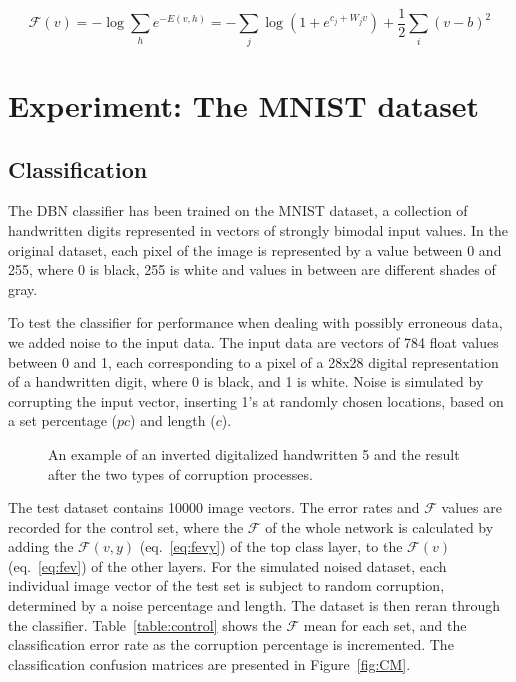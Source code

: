 \documentclass{report}
\begin{document}
\begin{equation}
\mathcal{F}(v) = -\log \sum_h e^{-E(v,h)} =  - \sum_j \log (1 + e^{c_j + W_j v}) + \frac{1}{2} \sum_i (v - b)^2
\label{eq:fegbv}
\end{equation}




\section{Experiment: The MNIST dataset}
\subsection{Classification}
The DBN classifier has been trained on the MNIST dataset, a collection of handwritten digits represented in vectors of strongly bimodal input values. In the original dataset, each pixel of the image is represented by a value between 0 and 255, where 0 is black, 255 is white and values in between are different shades of gray.


To test the classifier for performance when dealing with possibly erroneous data, we added noise to the input data. The input data are vectors of 784 float values between 0 and 1, each corresponding to a pixel of a 28x28 digital representation of a handwritten digit, where 0 is black, and 1 is white. Noise is simulated by corrupting the input vector, inserting 1's at randomly chosen locations, based on a set percentage ($pc$) and length ($c$).

\begin{figure}[h!]
	\caption{An example of an inverted digitalized handwritten 5 and the result after the two types of corruption processes.}
\end{figure}


The test dataset contains 10000 image vectors. The error rates and $\mathcal{F}$ values are recorded for the control set, where the $\mathcal{F}$ of the whole network is calculated by adding the $\mathcal{F}(v,y)$ (eq.~\ref{eq:fevy}) of the top class layer, to the $\mathcal{F}(v)$ (eq.~\ref{eq:fev}) of the other layers. For the simulated noised dataset, each individual image vector of the test set is subject to random corruption, determined by a noise percentage and length. The dataset is then reran through the classifier. Table~\ref{table:control} shows the $\mathcal{F}$ mean for each set, and the classification error rate as the corruption percentage is incremented. The classification confusion matrices are presented in Figure~\ref{fig:CM}.
\end{document}
